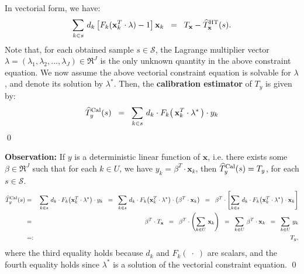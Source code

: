 \documentclass{article}
\begin{document}
In vectorial form, we have:
\begin{equation*}
\sum_{k \in s}\,d_{k}\left[F_{k}(\mathbf{x}_{k}^{T}\cdot\lambda) - 1\right] \mathbf{x}_{k}
\;\;=\;\; T_{\mathbf{x}} - \widehat{T}^{\textnormal{HT}}_{\mathbf{x}}(s).
\end{equation*}
Note that, for each obtained sample $s \in \mathcal{S}$, the Lagrange multiplier vector
$\lambda = (\lambda_{1},\lambda_{2},\ldots,\lambda_{J}) \in \Re^{J}$
is the only unknown quantity in the above constraint equation.
{\color{red}We now assume the above vectorial constraint equation is solvable for $\lambda$},
and denote its solution by $\lambda^{*}$.
Then, the \textbf{calibration estimator} of $T_{y}$ is given by:
\begin{equation*}
\widehat{T}^{\textnormal{Cal}}_{y}(s)
\;\;=\;\;
\sum_{k \in s}\,d_{k}\cdot F_{k}\!\left(\,\mathbf{x}_{k}^{T}\cdot\lambda^{*}\,\right)\cdot y_{k}
\end{equation*}
\qed

\vskip 0.5cm
\noindent
\textbf{Observation:}
\vskip 0.2cm
\noindent
If $y$ is a deterministic linear function of $\mathbf{x}$, i.e. there exists some $\beta \in \Re^{J}$
such that for each $k \in U$, we have $y_{k} = \beta^{T}\cdot\mathbf{x}_{k}$,
then $\widehat{T}^{\textnormal{Cal}}_{y}(s) = T_{y}$, for each $s \in \mathcal{S}$.
\vskip 0.2cm
\noindent
\proof
\begin{eqnarray*}
\widehat{T}^{\textnormal{Cal}}_{y}(s)
&=&   \sum_{k\in s}\,d_{k}\cdot F_{k}\!\left(\mathbf{x}^{T}_{k}\cdot\lambda^{*}\right)\cdot y_{k}
\;\;=\;\; \sum_{k\in s}\,d_{k}\cdot F_{k}\!\left(\mathbf{x}^{T}_{k}\cdot\lambda^{*}\right)\cdot\left(\beta^{T}\cdot\mathbf{x}_{k}\right) 
\;\;=\;\;   \beta^{T}\cdot\left[\sum_{k\in s}\,d_{k}\cdot F_{k}\!\left(\mathbf{x}^{T}_{k}\cdot\lambda^{*}\right)\cdot\mathbf{x}_{k}\right] \\
&=& \beta^{T}\cdot T_{\mathbf{x}}
\;\;=\;\; \beta^{T}\cdot\left(\sum_{k\in U}\,\mathbf{x}_{k}\right)
\;\;=\;\; \sum_{k\in U}\,\beta^{T}\cdot\mathbf{x}_{k}
\;\;=\;\; \sum_{k\in U}\,y_{k} \\
&=:& T_{y},
\end{eqnarray*}
where the third equality holds because $d_{k}$ and $F_{k}(\;\cdot\;)$ are scalars, and
the fourth equality holds since $\lambda^{*}$ is a solution of the vectorial constraint equation.
\qed


%
%
%



\end{document}
